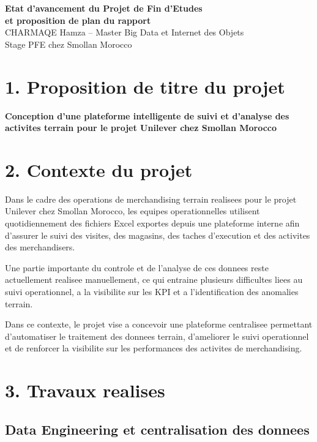 \documentclass[12pt,a4paper]{article}
\begin{document}
\begin{center}
    {\Large \textbf{Etat d'avancement du Projet de Fin d'Etudes}}\\[0.15cm]
    {\large \textbf{et proposition de plan du rapport}}\\[0.35cm]
    {\normalsize CHARMAQE Hamza -- Master Big Data et Internet des Objets}\\
    {\normalsize Stage PFE chez Smollan Morocco}
\end{center}

\section*{1. Proposition de titre du projet}

\textbf{Conception d'une plateforme intelligente de suivi et d'analyse des activites terrain pour le projet Unilever chez Smollan Morocco}

\section*{2. Contexte du projet}

Dans le cadre des operations de merchandising terrain realisees pour le projet Unilever chez Smollan Morocco, les equipes operationnelles utilisent quotidiennement des fichiers Excel exportes depuis une plateforme interne afin d'assurer le suivi des visites, des magasins, des taches d'execution et des activites des merchandisers.

Une partie importante du controle et de l'analyse de ces donnees reste actuellement realisee manuellement, ce qui entraine plusieurs difficultes liees au suivi operationnel, a la visibilite sur les KPI et a l'identification des anomalies terrain.

Dans ce contexte, le projet vise a concevoir une plateforme centralisee permettant d'automatiser le traitement des donnees terrain, d'ameliorer le suivi operationnel et de renforcer la visibilite sur les performances des activites de merchandising.

\section*{3. Travaux realises}

\subsection*{Data Engineering et centralisation des donnees}
\end{document}
